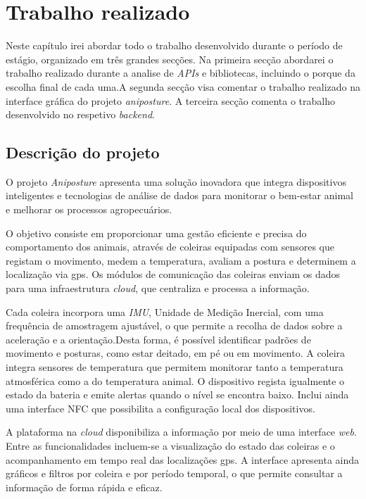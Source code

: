 \chapter{Trabalho realizado}
\label{chapter:work-done}

\begin{introduction}
    Neste capítulo irei abordar todo o trabalho desenvolvido durante o período de estágio, organizado em três grandes secções. Na primeira secção abordarei o trabalho realizado durante a analise de \textit{APIs} e bibliotecas, incluindo o porque da escolha final de cada uma.A segunda secção visa comentar o trabalho realizado na interface gráfica do projeto \textit{aniposture}. A terceira secção comenta o trabalho desenvolvido no respetivo \textit{backend}.
\end{introduction}

\section{Descrição do projeto}\label{sec:project} %
O projeto \textit{Aniposture} apresenta uma solução inovadora que integra dispositivos inteligentes e tecnologias de análise de dados para monitorar o bem-estar animal e melhorar os processos agropecuários. 

O objetivo consiste em proporcionar uma gestão eficiente e precisa do comportamento dos animais, através de coleiras equipadas com sensores que registam o movimento, medem a temperatura, avaliam a postura e determinem a localização via \acs{gps}. Os módulos de comunicação das coleiras enviam os dados para uma infraestrutura \textit{cloud}, que centraliza e processa a informação.

Cada coleira incorpora uma \textit{IMU}, Unidade de Medição Inercial, com uma frequência de amostragem ajustável, o que permite a recolha de dados sobre a aceleração e a orientação.Desta forma, é possível identificar padrões de movimento e posturas, como estar deitado, em pé ou em movimento. A coleira integra sensores de temperatura que permitem monitorar tanto a temperatura atmosférica como a do temperatura animal. O dispositivo regista igualmente o estado da bateria e emite alertas quando o nível se encontra baixo. Inclui ainda uma interface NFC que possibilita a configuração local dos dispositivos.

A plataforma na \textit{cloud} disponibiliza a informação por meio de uma interface \textit{web}. Entre as funcionalidades incluem-se a visualização do estado das coleiras e o acompanhamento em tempo real das localizações \acs{gps}. A interface apresenta ainda gráficos e filtros por coleira e por período temporal, o que permite consultar a informação de forma rápida e eficaz.

